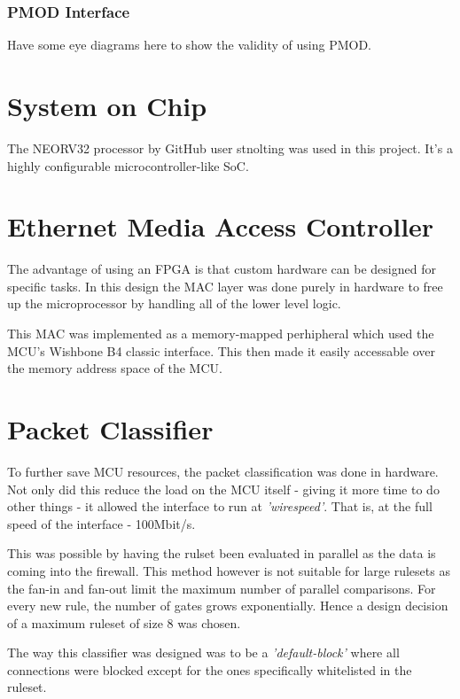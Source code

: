 \subsubsection{PMOD Interface}

Have some eye diagrams here to show the validity of using PMOD.

\section{System on Chip}

The NEORV32 processor by GitHub user stnolting was used in this project. It's a highly configurable microcontroller-like SoC. 







\section{Ethernet Media Access Controller}
The advantage of using an FPGA is that custom hardware can be designed for specific tasks. In this design the MAC layer was done purely in hardware to free up the microprocessor by handling all of the lower level logic. 

This MAC was implemented as a memory-mapped perhipheral which used the MCU's Wishbone B4 classic interface. This then made it easily accessable over the memory address space of the MCU.  



\section{Packet Classifier}

To further save MCU resources, the packet classification was done in hardware. Not only did this reduce the load on the MCU itself - giving it more time to do other things - it allowed the interface to run at \textit{'wirespeed'}. That is, at the full speed of the interface - 100Mbit/s. 

This was possible by having the rulset been evaluated in parallel as the data is coming into the firewall. This method however is not suitable for large rulesets as the fan-in and fan-out limit the maximum number of parallel comparisons. For every new rule, the number of gates grows exponentially. Hence a design decision of a maximum ruleset of size 8 was chosen. 

The way this classifier was designed was to be a \textit{'default-block'} where all connections were blocked except for the ones specifically whitelisted in the ruleset. 

